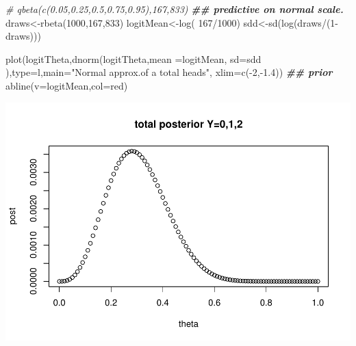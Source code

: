 \documentclass[
]{book}
\newenvironment{Shaded}{\begin{snugshade}}{\end{snugshade}}
\newcommand{\AttributeTok}[1]{\textcolor[rgb]{0.77,0.63,0.00}{#1}}
\newcommand{\CommentTok}[1]{\textcolor[rgb]{0.56,0.35,0.01}{\textit{#1}}}
\newcommand{\DecValTok}[1]{\textcolor[rgb]{0.00,0.00,0.81}{#1}}
\newcommand{\DocumentationTok}[1]{\textcolor[rgb]{0.56,0.35,0.01}{\textbf{\textit{#1}}}}
\newcommand{\FloatTok}[1]{\textcolor[rgb]{0.00,0.00,0.81}{#1}}
\newcommand{\FunctionTok}[1]{\textcolor[rgb]{0.00,0.00,0.00}{#1}}
\newcommand{\NormalTok}[1]{#1}
\newcommand{\OtherTok}[1]{\textcolor[rgb]{0.56,0.35,0.01}{#1}}
\newcommand{\SpecialCharTok}[1]{\textcolor[rgb]{0.00,0.00,0.00}{#1}}
\newcommand{\StringTok}[1]{\textcolor[rgb]{0.31,0.60,0.02}{#1}}
\theoremstyle{definition}
\theoremstyle{definition}
\theoremstyle{definition}
\theoremstyle{definition}
\theoremstyle{remark}
\begin{document}
\begin{Shaded}
\begin{Highlighting}[]
   \CommentTok{\#  qbeta(c(0.05,0.25,0.5,0.75,0.95),167,833)}
    \DocumentationTok{\#\# predictive on normal scale.}
\NormalTok{     draws}\OtherTok{\textless{}{-}}\FunctionTok{rbeta}\NormalTok{(}\DecValTok{1000}\NormalTok{,}\DecValTok{167}\NormalTok{,}\DecValTok{833}\NormalTok{)}
\NormalTok{     logitMean}\OtherTok{\textless{}{-}}\FunctionTok{log}\NormalTok{( }\DecValTok{167}\SpecialCharTok{/}\DecValTok{1000}\NormalTok{)}
\NormalTok{  sdd}\OtherTok{\textless{}{-}}\FunctionTok{sd}\NormalTok{(}\FunctionTok{log}\NormalTok{(draws}\SpecialCharTok{/}\NormalTok{(}\DecValTok{1}\SpecialCharTok{{-}}\NormalTok{draws)))}

  \FunctionTok{plot}\NormalTok{(logitTheta,}\FunctionTok{dnorm}\NormalTok{(logitTheta,}\AttributeTok{mean =}\NormalTok{logitMean, }\AttributeTok{sd=}\NormalTok{sdd ),}\AttributeTok{type=}\StringTok{\textquotesingle{}l\textquotesingle{}}\NormalTok{,}\AttributeTok{main=}\StringTok{"Normal approx.of a total heads"}\NormalTok{, }\AttributeTok{xlim=}\FunctionTok{c}\NormalTok{(}\SpecialCharTok{{-}}\DecValTok{2}\NormalTok{,}\SpecialCharTok{{-}}\FloatTok{1.4}\NormalTok{)) }\DocumentationTok{\#\# prior}
    \FunctionTok{abline}\NormalTok{(}\AttributeTok{v=}\NormalTok{logitMean,}\AttributeTok{col=}\StringTok{\textquotesingle{}red\textquotesingle{}}\NormalTok{)}
\end{Highlighting}
\end{Shaded}

\includegraphics{_main_files/figure-latex/unnamed-chunk-11-2.pdf}
\end{document}
